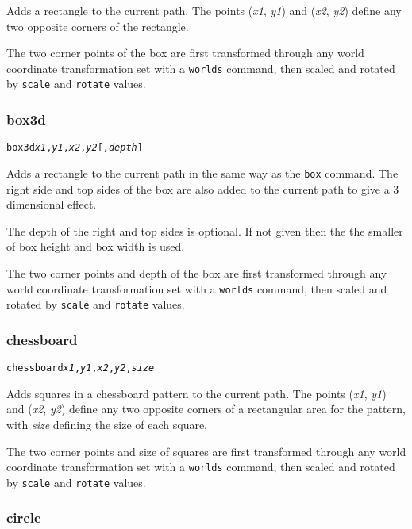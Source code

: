 Adds a rectangle to the current path.
The points
(\textit{x1}, \textit{y1}) and (\textit{x2}, \textit{y2}) define
any two opposite corners of the rectangle.

The two corner points of the box
are first transformed through any world coordinate
transformation set with a \texttt{worlds} command,
then scaled and rotated by \texttt{scale}
and \texttt{rotate} values.

\subsubsection{box3d}

\begin{alltt}
box3d \textit{x1}, \textit{y1}, \textit{x2}, \textit{y2} [, \textit{depth}]
\end{alltt}

Adds a rectangle to the current path in the same way as
the \texttt{box} command.  The right side and top sides of the
box are also added to the current path to give a 3 dimensional effect.

The depth of the right and top sides is optional.  If not given
then the the smaller of box height and box width is used.

The two corner points and depth of the box
are first transformed through any world coordinate
transformation set with a \texttt{worlds} command,
then scaled and rotated by \texttt{scale}
and \texttt{rotate} values.

\subsubsection{chessboard}

\begin{alltt}
chessboard \textit{x1}, \textit{y1}, \textit{x2}, \textit{y2}, \textit{size}
\end{alltt}

Adds squares in a chessboard pattern to the current path.
The points
(\textit{x1}, \textit{y1}) and (\textit{x2}, \textit{y2}) define
any two opposite corners of a rectangular area for the pattern, with
\textit{size} defining the size of each square.

The two corner points and size of squares
are first transformed through any world coordinate
transformation set with a \texttt{worlds} command,
then scaled and rotated by \texttt{scale}
and \texttt{rotate} values.

\subsubsection{circle}

